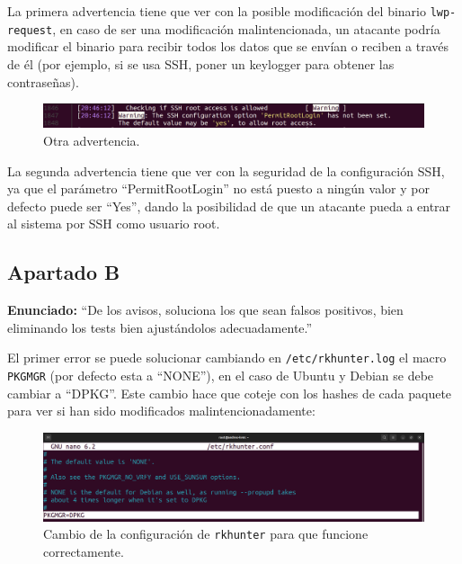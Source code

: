 \documentclass{article}
\begin{document}
La primera advertencia tiene que ver con la posible modificación del binario \verb|lwp-request|, en caso de ser una modificación malintencionada, un atacante podría modificar el binario para recibir todos los datos que se envían o reciben a través de él (por ejemplo, si se usa SSH, poner un keylogger para obtener las contraseñas).

\begin{figure}[H]
    \includegraphics[width=\textwidth]{imagenes/warn2.png}
    \caption{Otra advertencia.}
\end{figure}

\bigskip

La segunda advertencia tiene que ver con la seguridad de la configuración SSH, ya que el parámetro ``PermitRootLogin'' no está puesto a ningún valor y por defecto puede ser ``Yes'', dando la posibilidad de que un atacante pueda a entrar al sistema por SSH como usuario root.

\newpage

\subsection{Apartado B}

\textbf{Enunciado: }``De los avisos, soluciona los que sean falsos positivos, bien eliminando los tests bien ajustándolos adecuadamente.''

\bigskip

El primer error se puede solucionar cambiando en \verb|/etc/rkhunter.log| el macro \verb|PKGMGR| (por defecto esta a ``NONE''), en el caso de Ubuntu y Debian se debe cambiar a ``DPKG''. Este cambio hace que coteje con los hashes de cada paquete para ver si han sido modificados malintencionadamente:

\begin{figure}[H]
    \includegraphics[width=\textwidth]{imagenes/rkhuntermacrodpkg.png}
    \caption{Cambio de la configuración de \texttt{rkhunter} para que funcione correctamente.}
\end{figure}
\end{document}
